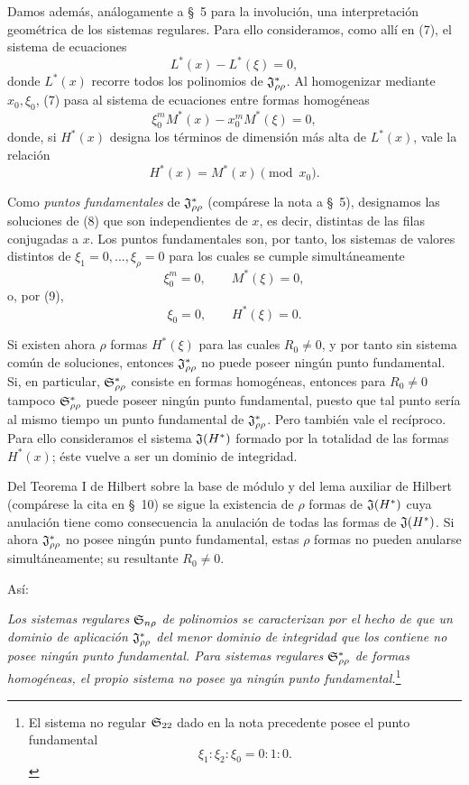 \documentclass[11pt]{article}
\begin{document}
Damos además, análogamente a \S\ 5 para la involución, una interpretación geométrica de los sistemas regulares. Para ello consideramos, como allí en (7), el sistema de ecuaciones
\begin{equation}
  L^*(x)-L^*(\xi)=0,
\tag{7}
\end{equation}
donde $L^*(x)$ recorre todos los polinomios de $\mathfrak{J}^*_{\rho\rho}$. Al homogenizar mediante $x_0,\xi_0$, (7) pasa al sistema de ecuaciones entre formas homogéneas
\begin{equation}
  \xi_0^{m}M^*(x)-x_0^{m}M^*(\xi)=0,
\tag{8}
\end{equation}
donde, si $H^*(x)$ designa los términos de dimensión más alta de $L^*(x)$, vale la relación
\begin{equation}
  H^*(x)=M^*(x)\pmod{x_0}.
\tag{9}
\end{equation}

Como \emph{puntos fundamentales} de $\mathfrak{J}^*_{\rho\rho}$ (compárese la nota a \S\ 5), designamos las soluciones de (8) que son independientes de $x$, es decir, distintas de las filas conjugadas a $x$. Los puntos fundamentales son, por tanto, los sistemas de valores distintos de $\xi_1=0,\ldots,\xi_\rho=0$ para los cuales se cumple simultáneamente
\[
  \xi_0^m=0,
  \qquad M^*(\xi)=0,
\]
o, por (9),
\[
  \xi_0=0,
  \qquad H^*(\xi)=0.
\]

Si existen ahora $\rho$ formas $H^*(\xi)$ para las cuales $R_0\ne0$, y por tanto sin sistema común de soluciones, entonces $\mathfrak{J}^*_{\rho\rho}$ no puede poseer ningún punto fundamental. Si, en particular, $\mathfrak{S}^*_{\rho\rho}$ consiste en formas homogéneas, entonces para $R_0\ne0$ tampoco $\mathfrak{S}^*_{\rho\rho}$ puede poseer ningún punto fundamental, puesto que tal punto sería al mismo tiempo un punto fundamental de $\mathfrak{J}^*_{\rho\rho}$. Pero también vale el recíproco. Para ello consideramos el sistema $\mathfrak{J}(H^*)$ formado por la totalidad de las formas $H^*(x)$; éste vuelve a ser un dominio de integridad.

Del Teorema I de Hilbert sobre la base de módulo y del lema auxiliar de Hilbert (compárese la cita en \S\ 10) se sigue la existencia de $\rho$ formas de $\mathfrak{J}(H^*)$ cuya anulación tiene como consecuencia la anulación de todas las formas de $\mathfrak{J}(H^*)$. Si ahora $\mathfrak{J}^*_{\rho\rho}$ no posee ningún punto fundamental, estas $\rho$ formas no pueden anularse simultáneamente; su resultante $R_0\ne0$.

Así:

\emph{Los sistemas regulares $\mathfrak{S}_{n\rho}$ de polinomios se caracterizan por el hecho de que un dominio de aplicación $\mathfrak{J}^*_{\rho\rho}$ del menor dominio de integridad que los contiene no posee ningún punto fundamental. Para sistemas regulares $\mathfrak{S}^*_{\rho\rho}$ de formas homogéneas, el propio sistema no posee ya ningún punto fundamental.}\footnote{El sistema no regular $\mathfrak{S}_{22}$ dado en la nota precedente posee el punto fundamental
\[
  \xi_1:\xi_2:\xi_0=0:1:0.
\]}
\end{document}
